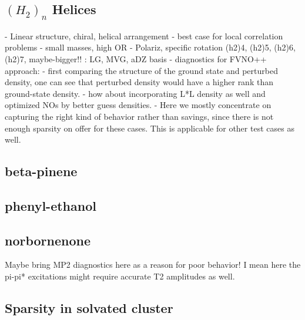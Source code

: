 \subsection{$(H_2)_n$ Helices}
- Linear structure, chiral, helical arrangement
- best case for local correlation problems
- small masses, high OR
- Polariz, specific rotation (h2)4, (h2)5, (h2)6, (h2)7, maybe-bigger!! : LG, MVG, aDZ basis
- diagnostics for FVNO++ approach:
	- first comparing the structure of the ground state and perturbed density, one can see 
	  that perturbed density would have a higher rank than ground-state density.
	- how about incorporating L*L density as well and optimized NOs by better guess densities.
	- Here we mostly concentrate on capturing the right kind of behavior rather 
  	than savings, since there is not enough sparsity on offer for these cases.
  	This is applicable for other test cases as well.
\subsection{beta-pinene}
\subsection{phenyl-ethanol}
\subsection{norbornenone}
Maybe bring MP2 diagnostics here as a reason for poor behavior! I mean here the pi-pi*
excitations might require accurate T2 amplitudes as well.
\subsection{Sparsity in solvated cluster}

